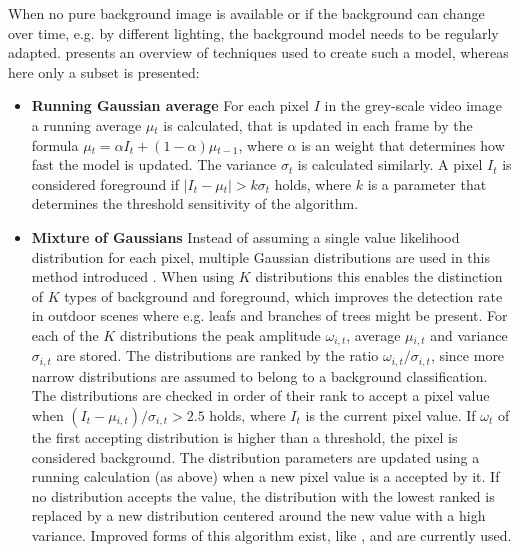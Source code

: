 When no pure background image is available 
or if the background can change over time, e.g. by different lighting,
the background model needs to be regularly adapted.
\textcite[][]{piccardi2004background} presents an overview of techniques used to create such a model, 
whereas here only a subset is presented:

\begin{itemize}
    
    \item \textbf{Running Gaussian average} For each pixel $ I $  in the grey-scale video image a running average $ \mu{}_t$ is calculated, that is updated in each frame by the formula $ \mu{}_t = \alpha{}I_t + (1 - \alpha)\mu{}_{t-1} $, where $ \alpha $ is an weight that determines how fast the model is updated. The variance $ \sigma{}_t $ is calculated similarly. A pixel $ I_t $ is considered foreground if $ |I_t - \mu{}_t| > k\sigma{}_t $ holds, where $ k $ is a parameter that determines the threshold sensitivity of the algorithm.
    \item \textbf{Mixture of Gaussians} Instead of assuming a single value likelihood distribution for each pixel, multiple Gaussian distributions are used in this method introduced \textcite[][]{stauffer1999background}. 
    When using $ K $ distributions this enables the distinction of $ K $ types of background and foreground, which improves the detection rate in outdoor scenes where e.g. leafs and branches of trees might be present. 
    For each of the $ K $ distributions the peak amplitude $ \omega{}_{i,t} $, average $ \mu{}_{i,t} $ and variance $ \sigma{}_{i,t} $ are stored.
    The distributions are ranked by the ratio $ \omega{}_{i,t} / \sigma{}_{i, t}$, since more narrow distributions are assumed to belong to a background classification.
    The distributions are checked in order of their rank to accept a pixel value when $ (I_t - \mu{}_{i,t})/\sigma{}_{i,t} > 2.5 $ holds, where $ I_t $ is the current pixel value.
    If $ \omega{}_{t} $ of the first accepting distribution is higher than a threshold, the pixel is considered background.
    The distribution parameters are updated using a running calculation (as above) when a new pixel value is a accepted by it.
    If no distribution accepts the value, the distribution with the lowest ranked is replaced by a new distribution centered around the new value with a high variance.
    Improved forms of this algorithm exist, like \autocite[][]{chan2011background}, and are currently used.
    
\end{itemize}

